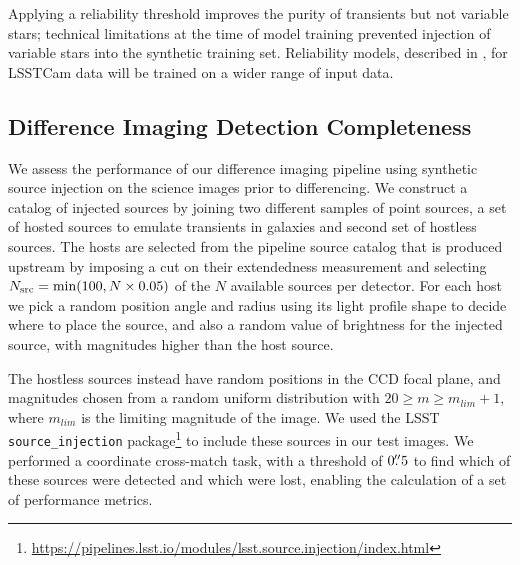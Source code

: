 Applying a reliability threshold improves the purity of transients but not variable stars; technical limitations at the time of model training prevented injection of variable stars into the synthetic training set.
Reliability models, described in ,  for \gls{LSSTCam} data will be trained on a wider range of input data.

\subsection{Difference Imaging Detection Completeness} \label{sec:perf:dia_completeness}

We assess the performance of our difference imaging \gls{pipeline} using synthetic source injection on the science images prior to differencing.
We construct a catalog of injected sources by joining two different samples of point sources, a set of hosted sources to emulate transients in galaxies and second set of hostless sources.
The hosts are selected from the pipeline source catalog that is produced upstream by imposing a cut on their extendedness measurement and selecting $N_{\rm src}={\rm min}(100, N\times0.05)$ of the $N$ available sources per detector.
For each host we pick a random position angle and radius using its light profile shape to decide where to place the source, and also a random value of brightness for the injected source, with magnitudes higher than the host source.

The hostless sources instead have random positions in the \gls{CCD} focal plane, and magnitudes chosen 
from a random uniform distribution with $20 \geq m \geq m_{lim} + 1$,  where $m_{lim}$ is the limiting magnitude of the image.
We used the \gls{LSST}  \texttt{source\_injection} package\footnote{\url{https://pipelines.lsst.io/modules/lsst.source.injection/index.html}} to include these sources in our test images.
We performed a coordinate cross-match task, with a threshold of $0\mbox{$.\!\!^{\prime\prime}$}5$ to find which of these sources were detected and which were lost, enabling the calculation of a set of performance metrics.

